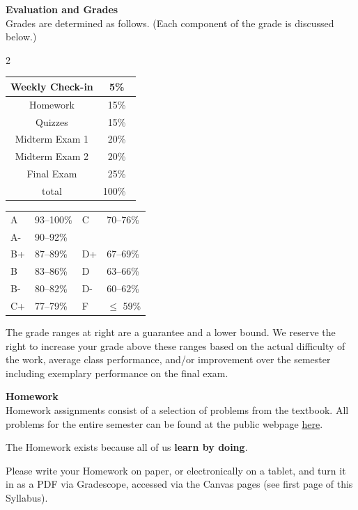 \documentclass[12pt]{article}
\renewcommand{\emph}[1]{\textsf{\textbf{#1}}}
\newcommand{\localhead}[1]{\par\smallskip\textbf{#1} \smallskip\nobreak\\}%
\def\heading#1{\localhead{\large\emph{#1}}}
\begin{document}
\heading{Evaluation and Grades}
Grades are determined as follows.  (Each component of the grade is discussed below.)
 
\begin{multicols}{2}
\begin{tabular}{|c|c|}
\hline
Weekly Check-in & 5\% \\
\hline
Homework & 15\% \\
\hline
Quizzes & 15\% \\
\hline
Midterm Exam 1 & 20\% \\
\hline
Midterm Exam 2 & 20\%  \\
\hline
Final Exam & 25\% \\
\hline
total & 100\% \, \\
\hline
\end{tabular}


\begin{tabular}{llll}
A  & 93--100\%& C  & 70--76\%  \\
A- & 90--92\% & &  \\
B+ & 87--89\% & D+ & 67--69\%  \\
B  & 83--86\% & D  & 63--66\%  \\
B- & 80--82\% & D- & 60--62\%  \\
C+ & 77--79\% & F  & $\le$ 59\%
\end{tabular}
\end{multicols}

The grade ranges at right are a guarantee and a lower bound. We reserve the right to increase your grade above these ranges based on the actual difficulty of the work, average class performance, and/or improvement over the semester including exemplary performance on the final exam. \\

\clearpage\newpage
\phantom{x}
\vspace{-4mm}

\heading{Homework}
Homework assignments consist of a selection of problems from the textbook.  All problems for the entire semester can be found at the public webpage \href{https://uaf-math.github.io/calc2/homework.html}{here}. 

The Homework exists because all of us \textbf{learn by doing}.

Please write your Homework on paper, or electronically on a tablet, and turn it in as a PDF via Gradescope, accessed via the Canvas pages (see first page of this Syllabus).  
\end{document}
